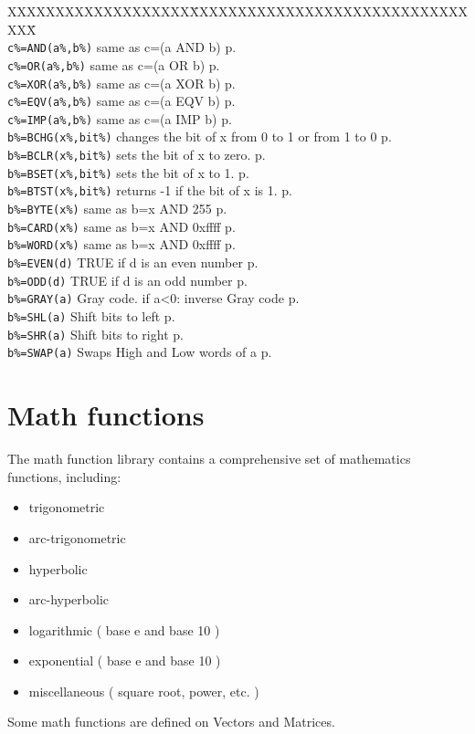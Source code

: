 \begin{tabbing}
XXXXXXXXXXXXXXXXXXX\=XXXXXXXXXXXXXXXXXXXXXXXXXXXXXXXX\=\kill\\
\verb|c%=AND(a%,b%)|	\> same as c=(a AND b)\> p.\pageref{AND}\\
\verb|c%=OR(a%,b%)|	\> same as c=(a OR b)\> p.\pageref{OR}\\
\verb|c%=XOR(a%,b%)|	\> same as c=(a XOR b)\> p.\pageref{XOR}\\
\verb|c%=EQV(a%,b%)|	\> same as c=(a EQV b)\> p.\pageref{EQV}\\
\verb|c%=IMP(a%,b%)|	\> same as c=(a IMP b)\> p.\pageref{IMP}\\
\verb|b%=BCHG(x%,bit%)|\> changes the bit of x from 0 to 1 or from 1 to 0\> p.\pageref{BCHG}\\
\verb|b%=BCLR(x%,bit%)|\> sets the bit of x to zero.\> p.\pageref{BCLR}\\
\verb|b%=BSET(x%,bit%)|\> sets the bit of x to 1.\> p.\pageref{BSET}\\
\verb|b%=BTST(x%,bit%)|\> returns -1 if the bit of x is 1.\> p.\pageref{BTST}\\
\verb|b%=BYTE(x%)|     \> same as b=x AND 255\> p.\pageref{BYTE}\\
\verb|b%=CARD(x%)|     \> same as b=x AND 0xffff \> p.\pageref{CARD}\\
\verb|b%=WORD(x%)|     \> same as b=x AND 0xffff \> p.\pageref{WORD}\\
\verb|b%=EVEN(d)|	\> TRUE if d is an even number\> p.\pageref{EVEN}\\
\verb|b%=ODD(d)|	\> TRUE if d is an odd number\> p.\pageref{ODD}\\
\verb|b%=GRAY(a)|      \>Gray code. if a<0: inverse Gray code\> p.\pageref{GRAY}\\
\verb|b%=SHL(a)|      \>Shift bits to left\> p.\pageref{SHL}\\
\verb|b%=SHR(a)|      \>Shift bits to right\> p.\pageref{SHR}\\
\verb|b%=SWAP(a)|      \>Swaps High and Low words of a \> p.\pageref{SWAP}\\
\end{tabbing}

\section{Math functions}

  The math function library contains a comprehensive set of mathematics
  functions, including:
\begin{itemize}
\item	trigonometric
\item	arc-trigonometric
\item	hyperbolic
\item	arc-hyperbolic
\item	logarithmic  ( base e and base 10 )
\item	exponential  ( base e and base 10 )
\item	miscellaneous  ( square root, power, etc. )
\end{itemize}
  Some math functions are defined on Vectors and Matrices.

